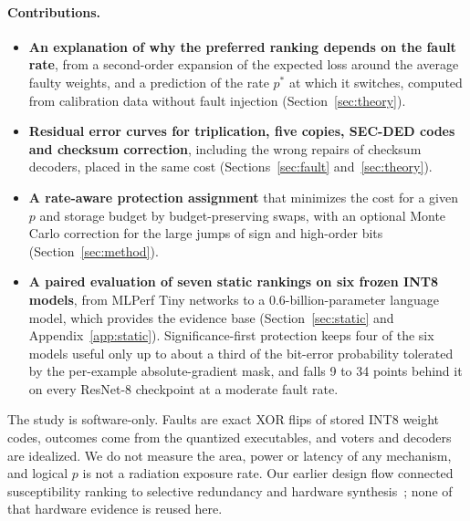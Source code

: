 \paragraph{Contributions.}
\begin{itemize}
\item \textbf{An explanation of why the preferred ranking depends on the fault rate}, from a second-order expansion of the expected loss around the average faulty weights, and a prediction of the rate $p^*$ at which it switches, computed from calibration data without fault injection (Section~\ref{sec:theory}). 
\item \textbf{Residual error curves for triplication, five copies, SEC-DED codes and checksum correction}, including the wrong repairs of checksum decoders, placed in the same cost (Sections~\ref{sec:fault} and~\ref{sec:theory}). 
\item \textbf{A rate-aware protection assignment} that minimizes the cost for a given $p$ and storage budget by budget-preserving swaps, with an optional Monte Carlo correction for the large jumps of sign and high-order bits (Section~\ref{sec:method}).  
\item \textbf{A paired evaluation of seven static rankings on six frozen INT8 models}, from MLPerf Tiny networks to a 0.6-billion-parameter language model, which provides the evidence base (Section~\ref{sec:static} and Appendix~\ref{app:static}). Significance-first protection keeps four of the six models useful only up to about a third of the bit-error probability tolerated by the per-example absolute-gradient mask, and falls 9 to 34 points behind it on every ResNet-8 checkpoint at a moderate fault rate.
\end{itemize}

The study is software-only. Faults are exact XOR flips of stored INT8 weight codes, outcomes come from the quantized executables, and voters and decoders are idealized. We do not measure the area, power or latency of any mechanism, and logical $p$ is not a radiation exposure rate. Our earlier design flow connected susceptibility ranking to selective redundancy and hardware synthesis~\cite{guo2025inpixel}; none of that hardware evidence is reused here.

